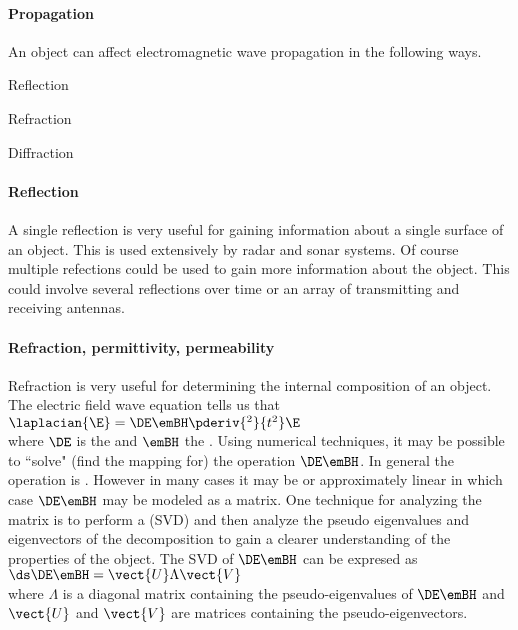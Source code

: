 \paragraph{Propagation}
An object can affect electromagnetic wave propagation in the following ways.
\begin{liste}
   \item Reflection
   \item Refraction
   \item Diffraction
\end{liste}

\paragraph{Reflection}
A single reflection is very useful for gaining information about a single surface of an object.
This is used extensively by radar and sonar systems.
Of course multiple refections could be used to gain more information about the object.
This could involve several reflections over time or an array of transmitting and receiving antennas.

\paragraph{Refraction, permittivity, permeability}
Refraction is very useful for determining the internal composition of an object.
The electric field wave equation tells us that
\\\indentx$\laplacian{\E} = \DE \emBH \pderiv{^2}{t^2}\E$\\
where $\DE$ is the  and $\emBH$ the .
Using numerical techniques, it may be possible to ``solve" (find the mapping for)
the operation $\DE \emBH$.
In general the operation is .
However in many cases it may be  or approximately linear in which case
$\DE \emBH$ may be modeled as a matrix.
One technique for analyzing the matrix is to perform a  (SVD)
and then analyze the pseudo eigenvalues and eigenvectors of the decomposition to
gain a clearer understanding of the properties of the object.  The SVD of $\DE\emBH$ can
be expresed as
\\\indentx$\ds\DE\emBH = \vect{U} \Lambda \vect{V}$\\
where $\Lambda$ is a diagonal matrix containing the pseudo-eigenvalues of $\DE\emBH$
and $\vect{U}$ and $\vect{V}$ are matrices containing
the pseudo-eigenvectors.

